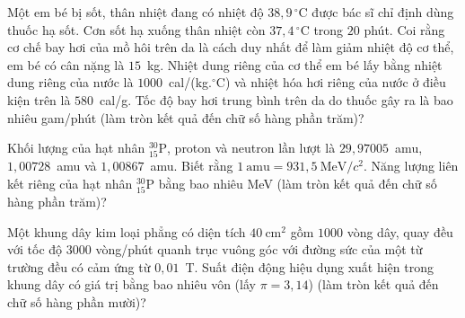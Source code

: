 	\begin{ex}%
		Một em bé bị sốt, thân nhiệt đang có nhiệt độ $38{,}9\,^\circ\text{C}$ được bác sĩ chỉ định dùng thuốc hạ sốt. Cơn sốt hạ xuống thân nhiệt còn $37{,}4\,^\circ\text{C}$ trong $20$ phút. Coi rằng cơ chế bay hơi của mồ hôi trên da là cách duy nhất để làm giảm nhiệt độ cơ thể, em bé có cân nặng là $15$~kg. Nhiệt dung riêng của cơ thể em bé lấy bằng nhiệt dung riêng của nước là $1000$~cal/(kg.$^\circ$C) và nhiệt hóa hơi riêng của nước ở điều kiện trên là $580$~cal/g. Tốc độ bay hơi trung bình trên da do thuốc gây ra là bao nhiêu gam/phút (làm tròn kết quả đến chữ số hàng phần trăm)?
		\par
	\end{ex}

	\begin{ex}%
		Khối lượng của hạt nhân ${}^{30}_{15}\text{P}$, proton và neutron lần lượt là $29{,}97005$~amu, $1{,}00728$~amu và $1{,}00867$~amu. Biết rằng $1~\text{amu}=931{,}5~\text{MeV}/c^2$. Năng lượng liên kết riêng của hạt nhân ${}^{30}_{15}\text{P}$ bằng bao nhiêu MeV (làm tròn kết quả đến chữ số hàng phần trăm)?
		\par
	\end{ex}

	\begin{ex}%
		Một khung dây kim loại phẳng có diện tích $40~\text{cm}^2$ gồm $1000$ vòng dây, quay đều với tốc độ $3000$ vòng/phút quanh trục vuông góc với đường sức của một từ trường đều có cảm ứng từ $0{,}01$~T. Suất điện động hiệu dụng xuất hiện trong khung dây có giá trị bằng bao nhiêu vôn (lấy $\pi=3{,}14$) (làm tròn kết quả đến chữ số hàng phần mười)?
		\par
	\end{ex}

